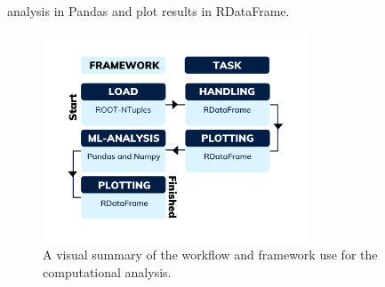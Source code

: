 analysis in Pandas and plot results in RDataFrame.
\begin{figure}
    \centering
    \includegraphics[width=0.7\textwidth]{Figures/Illustrations/TaskFlow.png}
    \caption{A visual summary of the workflow and framework use for the 
    computational analysis. }
    \label{fig:WF}
\end{figure}

